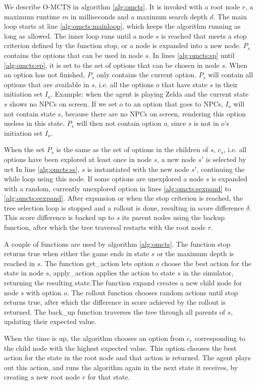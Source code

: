 We describe O-MCTS in algorithm \ref{alg:omcts}. It is invoked with a root node
$r$, a maximum runtime $m$ in milliseconds and a maximum search depth $d$. The
main loop starts at line \ref{alg:omcts:mainloop}, which keeps the algorithm
running as long as allowed. The inner loop runs until a node $s$ is reached
that meets a stop criterion defined by the function \textsf{stop}, or a node is
expanded into a new node. $P_s$ contains the options that can be used in node
$s$. In lines \ref{alg:omcts:sp} until \ref{alg:omcts:ep}, it is set to the set
of options that can be chosen in node $s$. When an option has not finished,
$P_s$ only contains the current option. $P_s$ will contain all
options that are available in $s$, i.e. all the options $o$ that have state $s$
in their initiation set $I_o$. 
Example: when the agent is playing Zelda and the
current state $s$ shows no NPCs on screen. If we set $o$ to an option that goes
to NPCs, $I_o$ will not contain state $s$, because there are no NPCs on
screen, rendering this option useless in this state. $P_s$ will then not contain
option $o$, since $s$ is not in $o$'s initiation set $I_o$.

When the set $P_s$ is the same as the set of options in the children of $s$,
$c_s$, i.e. all options have been explored at least once in node $s$, a new node $s'$ is
selected by \textsf{uct} In line
\ref{alg:omcts:ss}, $s$ is instantiated with the new node $s'$, continuing the
while loop using this node. If some options are unexplored a node $s$ is
expanded with a random, currently unexplored option in lines \ref{alg:omcts:sexpand} to
\ref{alg:omcts:eexpand}. After expansion or when the stop criterion is reached,
the tree selection loop is stopped and a rollout is done, resulting in score
difference $\delta$. This score difference is backed up to $s$ its parent nodes
using the backup function, after which the tree traversal restarts with the root
node $r$.

A couple of functions are used by algorithm \ref{alg:omcts}. The function
\textsf{stop} returns true when either the game ends in state $s$ or the maximum
depth is reached in $s$. The function \textsf{get\_action} lets option $o$
choose the best action for the state in node $s$, \textsf{apply\_action} applies
the action to state $s$ in the simulator, returning the resulting state.The
function \textsf{expand} creates a new child node for node $s$ with option $o$.
The \textsf{rollout} function chooses random actions until \textsf{stop} returns
true, after which the difference in score achieved by the rollout is returned.
The \textsf{back\_up} function traverses the tree through all parents of $s$,
updating their expected value.

When the time is up, the algorithm chooses an option from $c_r$ corresponding to
the child node with the highest expected value. This option chooses the best
action for the state in the root node and that action is returned. The agent
plays out this action, and runs the algorithm again in the next state it
receives, by creating a new root node $r$ for that state.

